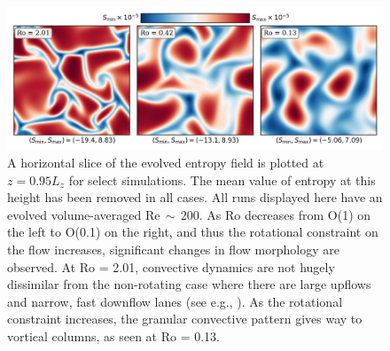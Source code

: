\documentclass[twocolumn, amsmath, amsfonts, amssymb]{aastex62}
\begin{document}
\begin{figure}[t]
    \includegraphics[width=\textwidth]{dynamics_plot.png}
    \caption{ A horizontal slice of the evolved entropy field is plotted at $z = 0.95L_z$
    for select simulations. The mean value of entropy at this height has been removed in all
    cases. All runs displayed here have an evolved volume-averaged Re$\,\sim\,200$. 
    As Ro decreases from O(1) on the left to O(0.1) on the right, and thus the rotational
    constraint on the flow increases, significant changes in flow morphology are observed.
    At Ro = 2.01, convective dynamics are not hugely dissimilar from the non-rotating
    case where there are large upflows and narrow, fast downflow lanes (see e.g., \AB).
    As the rotational constraint increases, the granular convective pattern gives way
    to vortical columns, as seen at Ro = 0.13.
    \label{fig:pretty_convection} }
\end{figure}
\end{document}
